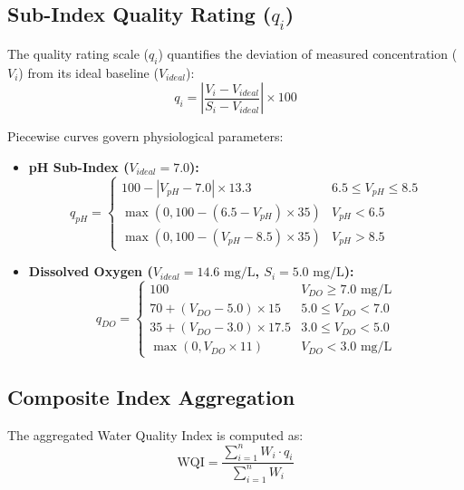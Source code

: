 \documentclass[conference]{IEEEtran}
\begin{document}
\subsection{Sub-Index Quality Rating ($q_i$)}
The quality rating scale ($q_i$) quantifies the deviation of measured concentration ($V_i$) from its ideal baseline ($V_{ideal}$):
\begin{equation}
q_i = \left| \frac{V_i - V_{ideal}}{S_i - V_{ideal}} \right| \times 100
\end{equation}

Piecewise curves govern physiological parameters:
\begin{itemize}
\item \textbf{pH Sub-Index ($V_{ideal} = 7.0$):}
\begin{equation}
q_{pH} = \begin{cases} 
100 - |V_{pH} - 7.0| \times 13.3 & 6.5 \le V_{pH} \le 8.5 \\
\max(0, 100 - (6.5 - V_{pH}) \times 35) & V_{pH} < 6.5 \\
\max(0, 100 - (V_{pH} - 8.5) \times 35) & V_{pH} > 8.5 
\end{cases}
\end{equation}

\item \textbf{Dissolved Oxygen ($V_{ideal} = 14.6\text{ mg/L}$, $S_i = 5.0\text{ mg/L}$):}
\begin{equation}
q_{DO} = \begin{cases} 
100 & V_{DO} \ge 7.0\text{ mg/L} \\
70 + (V_{DO} - 5.0) \times 15 & 5.0 \le V_{DO} < 7.0 \\
35 + (V_{DO} - 3.0) \times 17.5 & 3.0 \le V_{DO} < 5.0 \\
\max(0, V_{DO} \times 11) & V_{DO} < 3.0\text{ mg/L}
\end{cases}
\end{equation}
\end{itemize}

\subsection{Composite Index Aggregation}
The aggregated Water Quality Index is computed as:
\begin{equation}
\text{WQI} = \frac{\sum_{i=1}^{n} W_i \cdot q_i}{\sum_{i=1}^{n} W_i}
\end{equation}
\end{document}
